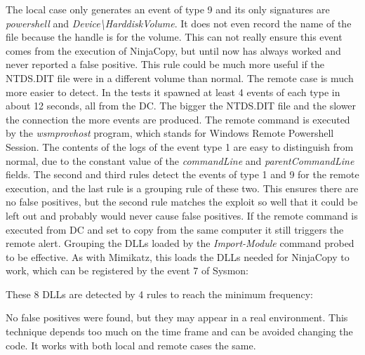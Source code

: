 \linej

\linej
The local case only generates an event of type 9 and its only signatures are \textit{powershell} and \textit{Device{\textbackslash}HarddiskVolume}. It does not even record the name of the file because the handle is for the volume. This can not really ensure this event comes from the execution of NinjaCopy, but until now has always worked and never reported a false positive. This rule could be much more useful if the NTDS.DIT file were in a different volume than normal.
\linej
\linej
The remote case is much more easier to detect. In the tests it spawned at least 4 events of each type in about 12 seconds, all from the DC.
The bigger the NTDS.DIT file and the slower the connection the more events are produced.
\linej
The remote command is executed by the \textit{wsmprovhost} program, which stands for Windows Remote Powershell Session.
The contents of the logs of the event type 1 are easy to distinguish from normal, due to the constant value of the \textit{commandLine} and \textit{parentCommandLine} fields.
\linej
The second and third rules detect the events of type 1 and 9 for the remote execution, and the last rule is a grouping rule of these two. This ensures there are no false positives, but the second rule matches the exploit so well that it could be left out and probably would never cause false positives.
\linej
If the remote command is executed from DC and set to copy from the same computer it still triggers the remote alert.
\linej
\linej
Grouping the DLLs loaded by the \textit{Import-Module} command probed to be effective. As with Mimikatz, this loads the DLLs needed for NinjaCopy to work, which can be registered by the event 7 of Sysmon:

\linej
These 8 DLLs are detected by 4 rules to reach the minimum frequency:

\linej
No false positives were found, but they may appear in a real environment. This technique depends too much on the time frame and can be avoided changing the code. It works with both local and remote cases the same.

